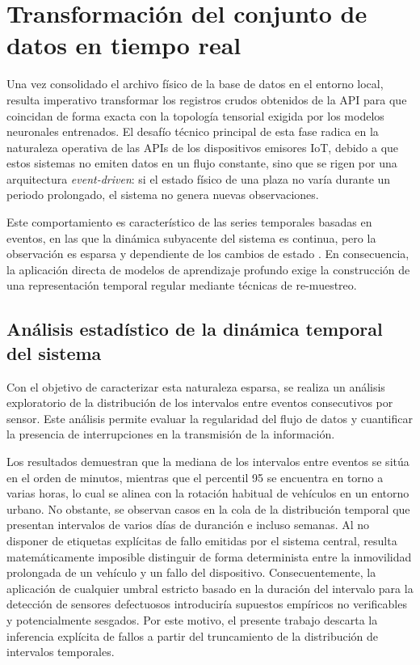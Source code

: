 \section{Transformación del conjunto de datos en tiempo real}
\label{sec:procesamiento_oot}

Una vez consolidado el archivo físico de la base de datos en el entorno local, resulta imperativo transformar los registros crudos obtenidos de la API para que coincidan de forma exacta con la topología tensorial exigida por los modelos neuronales entrenados. El desafío técnico principal de esta fase radica en la naturaleza operativa de las APIs de los dispositivos emisores IoT, debido a que estos sistemas no emiten datos en un flujo constante, sino que se rigen por una arquitectura \textit{event-driven}: si el estado físico de una plaza no varía durante un periodo prolongado, el sistema no genera nuevas observaciones.

Este comportamiento es característico de las series temporales basadas en eventos, en las que la dinámica subyacente del sistema es continua, pero la observación es esparsa y dependiente de los cambios de estado \cite{event_based_iot}. En consecuencia, la aplicación directa de modelos de aprendizaje profundo exige la construcción de una representación temporal regular mediante técnicas de re-muestreo.

\subsection{Análisis estadístico de la dinámica temporal del sistema}
\label{subsec:eda_temporal}

Con el objetivo de caracterizar esta naturaleza esparsa, se realiza un análisis exploratorio de la distribución de los intervalos entre eventos consecutivos por sensor. Este análisis permite evaluar la regularidad del flujo de datos y cuantificar la presencia de interrupciones en la transmisión de la información.

Los resultados demuestran que la mediana de los intervalos entre eventos se sitúa en el orden de minutos, mientras que el percentil 95 se encuentra en torno a varias horas, lo cual se alinea con la rotación habitual de vehículos en un entorno urbano. No obstante, se observan casos en la cola de la distribución temporal que presentan intervalos de varios días de duranción e incluso semanas. Al no disponer de etiquetas explícitas de fallo emitidas por el sistema central, resulta matemáticamente imposible distinguir de forma determinista entre la inmovilidad prolongada de un vehículo y un fallo del dispositivo. Consecuentemente, la aplicación de cualquier umbral estricto basado en la duración del intervalo para la detección de sensores defectuosos introduciría supuestos empíricos no verificables y potencialmente sesgados. Por este motivo, el presente trabajo descarta la inferencia explícita de fallos a partir del truncamiento de la distribución de intervalos temporales.

